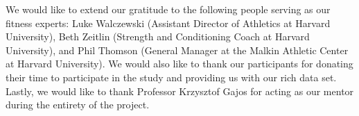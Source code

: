 We would like to extend our gratitude to the following people serving as our fitness experts: Luke Walczewski (Assistant Director of Athletics at Harvard University),  Beth Zeitlin (Strength and Conditioning Coach at Harvard University), and Phil Thomson (General Manager at the Malkin Athletic Center at Harvard University).  We would also like to thank our participants for donating their time to participate in the study and providing us with our rich data set.  Lastly, we would like to thank Professor Krzysztof Gajos for acting as our mentor during the entirety of the project.
